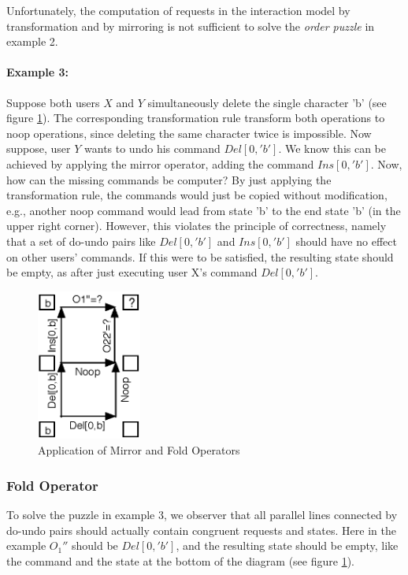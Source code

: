 Unfortunately, the computation of requests in the interaction model by transformation and by mirroring is not sufficient to solve the \emph{order puzzle} in example 2.

\paragraph{Example 3:} Suppose both users $X$ and $Y$ simultaneously delete the single character 'b' (see figure \ref{fig:concepts.basicfold}). The corresponding transformation rule transform both operations to noop operations, since deleting the same character twice is impossible. Now suppose, user $Y$ wants to undo his command $Del[0,'b']$. We know this can be achieved by applying the mirror operator, adding the command $Ins[0,'b']$. Now, how can the missing commands be computer? By just applying the transformation rule, the commands would just be copied without modification, e.g., another noop command would lead from state 'b' to the end state 'b' (in the upper right corner). However, this violates the principle of correctness, namely that a set of do-undo pairs like $Del[0,'b']$ and $Ins[0,'b']$ should have no effect on other users' commands. If this were to be satisfied, the resulting state should be empty, as after just executing user X's command $Del[0,'b']$. 

\begin{figure}[htb]
 \centering
 \includegraphics[width=3.45cm,height=4.97cm]{../../images/concepts_basicfold.eps}
 \caption{Application of Mirror and Fold Operators}
 \label{fig:concepts.basicfold}
\end{figure}


\subsubsection{Fold Operator}
To solve the puzzle in example 3, we observer that all parallel lines connected by do-undo pairs should actually contain congruent requests and states. Here in the example $O_{1}''$ should be $Del[0,'b']$, and the resulting state should be empty, like the command and the state at the bottom of the diagram (see figure \ref{fig:concepts.basicfold}).

